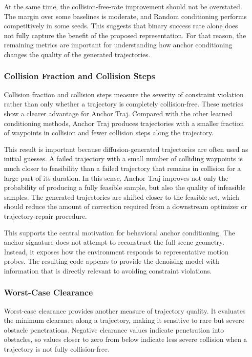 At the same time, the collision-free-rate improvement should not be overstated. The margin over some baselines is moderate, and Random conditioning performs competitively in some seeds. This suggests that binary success rate alone does not fully capture the benefit of the proposed representation. For that reason, the remaining metrics are important for understanding how anchor conditioning changes the quality of the generated trajectories.

\subsubsection{Collision Fraction and Collision Steps}

Collision fraction and collision steps measure the severity of constraint violation rather than only whether a trajectory is completely collision-free. These metrics show a clearer advantage for Anchor Traj. Compared with the other learned conditioning methods, Anchor Traj produces trajectories with a smaller fraction of waypoints in collision and fewer collision steps along the trajectory.

This result is important because diffusion-generated trajectories are often used as initial guesses. A failed trajectory with a small number of colliding waypoints is much closer to feasibility than a failed trajectory that remains in collision for a large part of its duration. In this sense, Anchor Traj improves not only the probability of producing a fully feasible sample, but also the quality of infeasible samples. The generated trajectories are shifted closer to the feasible set, which should reduce the amount of correction required from a downstream optimizer or trajectory-repair procedure.

This supports the central motivation for behavioral anchor conditioning. The anchor signature does not attempt to reconstruct the full scene geometry. Instead, it exposes how the environment responds to representative motion probes. The resulting code appears to provide the denoising model with information that is directly relevant to avoiding constraint violations.

\subsubsection{Worst-Case Clearance}

Worst-case clearance provides another measure of trajectory quality. It evaluates the minimum clearance along a trajectory, making it sensitive to rare but severe obstacle penetrations. Negative clearance values indicate penetration into obstacles, so values closer to zero from below indicate less severe collision when a trajectory is not fully collision-free.

